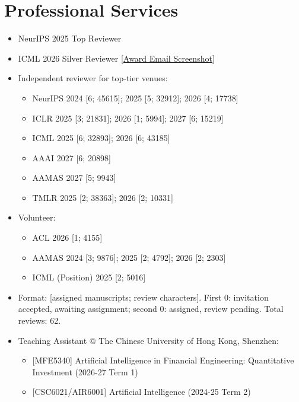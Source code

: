 \documentclass[a4paper,20pt]{article}
\begin{document}
\vspace{5pt}
\section{Professional Services}
\vspace{3pt}

\begin{itemize}[leftmargin=*, itemsep=0pt, topsep=0pt, partopsep=0pt]
    \item NeurIPS 2025 Top Reviewer
    \item ICML 2026 Silver Reviewer
          \href{https://yuelin301.github.io/assets/img/about/icml-2026-silver-reviewer-award-email.png}{[Award Email Screenshot]}
    \item Independent reviewer for top-tier venues:
    \begin{itemize}
        \item NeurIPS 2024 [6; 45615]; 2025 [5; 32912]; 2026 [4; 17738]
        \item ICLR 2025 [3; 21831]; 2026 [1; 5994]; 2027 [6; 15219]
        \item ICML 2025 [6; 32893]; 2026 [6; 43185]
        \item AAAI 2027 [6; 20898]
        \item AAMAS 2027 [5; 9943]
        \item TMLR 2025 [2; 38363]; 2026 [2; 10331]
    \end{itemize}
    \item Volunteer:
    \begin{itemize}
        \item ACL 2026 [1; 4155]
        \item AAMAS 2024 [3; 9876]; 2025 [2; 4792]; 2026 [2; 2303]
        \item ICML (Position) 2025 [2; 5016]
    \end{itemize}
    \item Format: [assigned manuscripts; review characters]. First 0: invitation accepted, awaiting assignment; second 0: assigned, review pending. Total reviews: 62.
    \item Teaching Assistant @ The Chinese University of Hong Kong, Shenzhen:
    \begin{itemize}
        \item {[MFE5340]} Artificial Intelligence in Financial Engineering: Quantitative Investment (2026-27 Term 1)
        \item {[CSC6021/AIR6001]} Artificial Intelligence (2024-25 Term 2)
    \end{itemize}
\end{itemize}
\end{document}
